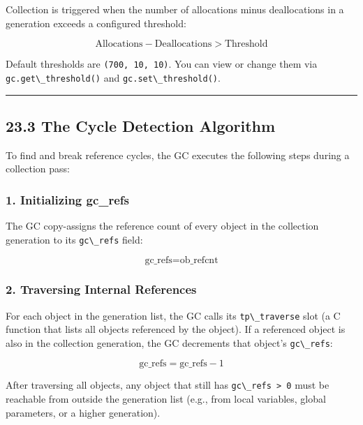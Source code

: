 Collection is triggered when the number of allocations minus
deallocations in a generation exceeds a configured threshold:

\[\text{Allocations} - \text{Deallocations} > \text{Threshold}\]

Default thresholds are \passthrough{\lstinline!(700, 10, 10)!}. You can
view or change them via \passthrough{\lstinline!gc.get\_threshold()!}
and \passthrough{\lstinline!gc.set\_threshold()!}.

\begin{center}\rule{0.5\linewidth}{0.5pt}\end{center}

\hypertarget{the-cycle-detection-algorithm}{%
\subsection{23.3 The Cycle Detection
Algorithm}\label{the-cycle-detection-algorithm}}

To find and break reference cycles, the GC executes the following steps
during a collection pass:

\hypertarget{initializing-gc_refs}{%
\subsubsection{1. Initializing gc\_refs}\label{initializing-gc_refs}}

The GC copy-assigns the reference count of every object in the
collection generation to its \passthrough{\lstinline!gc\_refs!} field:

\[\text{gc\_refs} = \text{ob\_refcnt}\]

\hypertarget{traversing-internal-references}{%
\subsubsection{2. Traversing Internal
References}\label{traversing-internal-references}}

For each object in the generation list, the GC calls its
\passthrough{\lstinline!tp\_traverse!} slot (a C function that lists all
objects referenced by the object). If a referenced object is also in the
collection generation, the GC decrements that object's
\passthrough{\lstinline!gc\_refs!}:

\[\text{gc\_refs} = \text{gc\_refs} - 1\]

After traversing all objects, any object that still has
\passthrough{\lstinline!gc\_refs > 0!} must be reachable from outside
the generation list (e.g., from local variables, global parameters, or a
higher generation).

